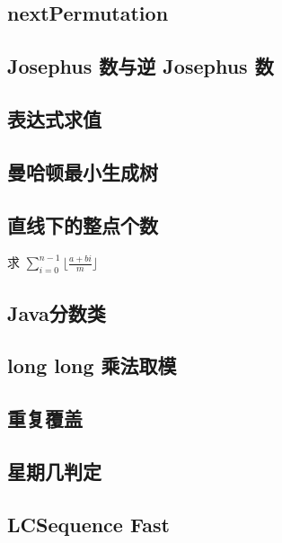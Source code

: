 \documentclass[landscape, twocolumn, 8pt, a4paper, twoside]{extarticle}
\begin{document}
  \subsection{nextPermutation}
    

  \subsection{Josephus 数与逆 Josephus 数}
    
  
  \subsection{表达式求值}
    

  \subsection{曼哈顿最小生成树}
    

  \subsection{直线下的整点个数}
    求 $\sum_{i=0}^{n-1} \lfloor\frac{a+bi}{m}\rfloor$
    

  \subsection{Java分数类}
    

  \subsection{long long 乘法取模}
    

  \subsection{重复覆盖}
    
  
  \subsection{星期几判定}
    

  \subsection{LCSequence Fast}
    
\end{document}
